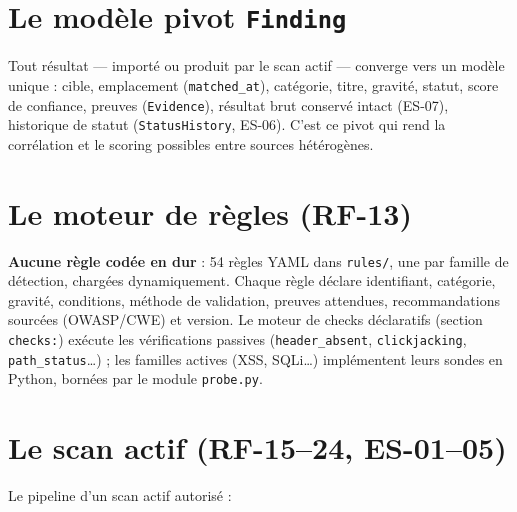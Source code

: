 \documentclass[11pt,a4paper]{report}
\newcommand{\code}[1]{\texttt{#1}}
\begin{document}
\section{Le modèle pivot \code{Finding}}

Tout résultat --- importé ou produit par le scan actif --- converge vers un modèle unique :
cible, emplacement (\code{matched\_at}), catégorie, titre, gravité, statut, score de
confiance, preuves (\code{Evidence}), résultat brut conservé intact (ES-07), historique de
statut (\code{StatusHistory}, ES-06). C'est ce pivot qui rend la corrélation et le scoring
possibles entre sources hétérogènes.

\section{Le moteur de règles (RF-13)}

\textbf{Aucune règle codée en dur} : 54 règles YAML dans \code{rules/}, une par famille de
détection, chargées dynamiquement. Chaque règle déclare identifiant, catégorie, gravité,
conditions, méthode de validation, preuves attendues, recommandations sourcées
(OWASP/CWE) et version. Le moteur de checks déclaratifs (section \code{checks:}) exécute
les vérifications passives (\code{header\_absent}, \code{clickjacking},
\code{path\_status}\ldots) ; les familles actives (XSS, SQLi\ldots) implémentent leurs
sondes en Python, bornées par le module \code{probe.py}.

\section{Le scan actif (RF-15--24, ES-01--05)}

Le pipeline d'un scan actif autorisé :
\end{document}

